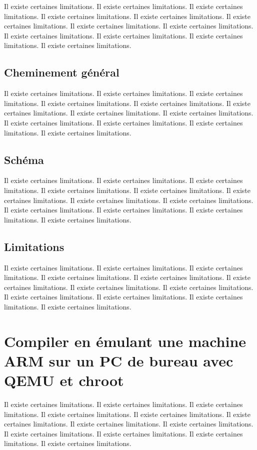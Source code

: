 \documentclass[11pt,a4paper,oneside]{report}
\begin{document}
Il existe certaines limitations.
Il existe certaines limitations.
Il existe certaines limitations.
Il existe certaines limitations.
Il existe certaines limitations.
Il existe certaines limitations.
Il existe certaines limitations.
Il existe certaines limitations.
Il existe certaines limitations.
Il existe certaines limitations.
Il existe certaines limitations.
Il existe certaines limitations.
\subsection{Cheminement général}

Il existe certaines limitations.
Il existe certaines limitations.
Il existe certaines limitations.
Il existe certaines limitations.
Il existe certaines limitations.
Il existe certaines limitations.
Il existe certaines limitations.
Il existe certaines limitations.
Il existe certaines limitations.
Il existe certaines limitations.
Il existe certaines limitations.
Il existe certaines limitations.
\subsection{Schéma}

Il existe certaines limitations.
Il existe certaines limitations.
Il existe certaines limitations.
Il existe certaines limitations.
Il existe certaines limitations.
Il existe certaines limitations.
Il existe certaines limitations.
Il existe certaines limitations.
Il existe certaines limitations.
Il existe certaines limitations.
Il existe certaines limitations.
Il existe certaines limitations.
\subsection{Limitations}

Il existe certaines limitations.
Il existe certaines limitations.
Il existe certaines limitations.
Il existe certaines limitations.
Il existe certaines limitations.
Il existe certaines limitations.
Il existe certaines limitations.
Il existe certaines limitations.
Il existe certaines limitations.
Il existe certaines limitations.
Il existe certaines limitations.
Il existe certaines limitations.


\section{Compiler en émulant une machine ARM sur un PC de bureau avec QEMU et chroot}

Il existe certaines limitations.
Il existe certaines limitations.
Il existe certaines limitations.
Il existe certaines limitations.
Il existe certaines limitations.
Il existe certaines limitations.
Il existe certaines limitations.
Il existe certaines limitations.
Il existe certaines limitations.
Il existe certaines limitations.
Il existe certaines limitations.
Il existe certaines limitations.
\end{document}

